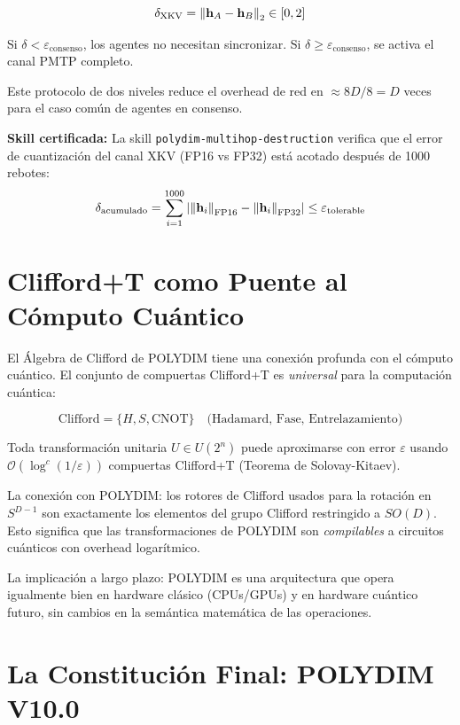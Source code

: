 \begin{equation}
\delta_{\text{XKV}} = \norm{\mathbf{h}_A - \mathbf{h}_B}_2 \in [0, 2]
\end{equation}

Si $\delta < \varepsilon_{\text{consenso}}$, los agentes no necesitan sincronizar.
Si $\delta \ge \varepsilon_{\text{consenso}}$, se activa el canal PMTP completo.

Este protocolo de dos niveles reduce el overhead de red en $\approx 8D/8 = D$ veces
para el caso común de agentes en consenso.

\textbf{Skill certificada:} La skill \texttt{polydim-multihop-destruction} verifica
que el error de cuantización del canal XKV (FP16 vs FP32) está acotado después de
1000 rebotes:
\begin{equation}
\delta_{\text{acumulado}} = \sum_{i=1}^{1000} |\norm{\mathbf{h}_i}_{\text{FP16}} - \norm{\mathbf{h}_i}_{\text{FP32}}| \le \varepsilon_{\text{tolerable}}
\end{equation}

\section{Clifford+T como Puente al Cómputo Cuántico}

El Álgebra de Clifford de POLYDIM tiene una conexión profunda con el cómputo cuántico.
El conjunto de compuertas Clifford+T es \textit{universal} para la computación cuántica:

\begin{equation}
\text{Clifford} = \{H, S, \text{CNOT}\} \quad \text{(Hadamard, Fase, Entrelazamiento)}
\end{equation}

Toda transformación unitaria $U \in U(2^n)$ puede aproximarse con error $\varepsilon$
usando $\mathcal{O}(\log^c(1/\varepsilon))$ compuertas Clifford+T (Teorema de Solovay-Kitaev).

La conexión con POLYDIM: los rotores de Clifford usados para la rotación en $S^{D-1}$
son exactamente los elementos del grupo Clifford restringido a $SO(D)$. Esto significa
que las transformaciones de POLYDIM son \textit{compilables} a circuitos cuánticos
con overhead logarítmico.

La implicación a largo plazo: POLYDIM es una arquitectura que opera igualmente bien
en hardware clásico (CPUs/GPUs) y en hardware cuántico futuro, sin cambios en la
semántica matemática de las operaciones.

\section{La Constitución Final: POLYDIM V10.0}


